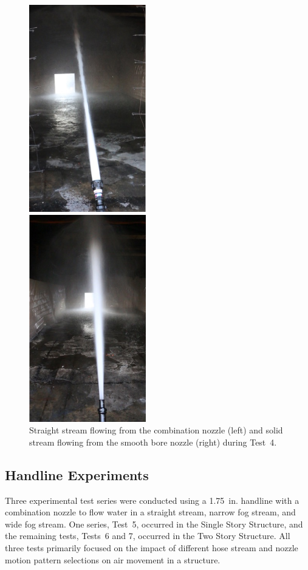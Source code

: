 \documentclass[12pt,oneside]{book}
\begin{document}
\begin{figure}[!ht]
	\minipage{2.15in}
	\begin{center}
		\includegraphics[width=2in]{../Figures/Pictures/SS_70}
	\end{center} 
	\endminipage
	\minipage{2.15in}
	\begin{center}
		\includegraphics[width=2in]{../Figures/Pictures/SB_70}
	\end{center}
	\endminipage
	\caption[Straight stream from combination nozzle and solid stream from smooth bore nozzle with 1~in. tip during Test~4.]{Straight stream flowing from the combination nozzle (left) and solid stream flowing from the smooth bore nozzle (right) during Test~4.}
	\label{fig:test_4_pic}
\end{figure}
\FloatBarrier

\subsection{Handline Experiments}
\label{sec:handline_procedure}
Three experimental test series were conducted using a 1.75~in. handline with a combination nozzle to flow water in a straight stream, narrow fog stream, and wide fog stream. One series, Test~5, occurred in the Single Story Structure, and the remaining tests, Tests~6 and 7, occurred in the Two Story Structure. All three tests primarily focused on the impact of different hose stream and nozzle motion pattern selections on air movement in a structure. 
\end{document}

